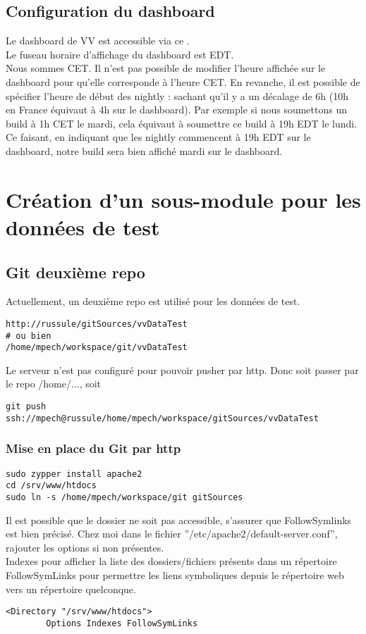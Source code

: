 \documentclass[12pt]{report}
\begin{document}
\section{Configuration du dashboard}
Le dashboard de VV est accessible via ce .\\

Le fuseau horaire d'affichage du dashboard est EDT.\\
Nous sommes CET. Il n'est pas possible de modifier l'heure affichée sur le dashboard pour qu'elle
corresponde à l'heure CET.
En revanche, il est possible de spécifier l'heure de début des nightly : sachant qu'il y a un décalage de 6h
(10h en France équivaut à 4h sur le dashboard). Par exemple si nous soumettons un build à 1h CET le mardi, cela équivaut à soumettre ce build à 19h EDT le lundi.\\
Ce faisant, en indiquant que les nightly commencent à 19h EDT sur le dashboard, notre build sera bien affiché mardi sur le dashboard.


 \chapter{Création d'un sous-module pour les données de test}
\section{Git deuxième repo}
Actuellement, un deuxième repo est utilisé pour les données de test.
\begin{verbatim}
http://russule/gitSources/vvDataTest
# ou bien 
/home/mpech/workspace/git/vvDataTest
\end{verbatim}

Le serveur n'est pas configuré pour pouvoir pusher par http. Donc soit passer par le repo /home/..., soit
\begin{verbatim}
git push ssh://mpech@russule/home/mpech/workspace/gitSources/vvDataTest
\end{verbatim}

\subsection{Mise en place du Git par http}
\begin{verbatim}
sudo zypper install apache2
cd /srv/www/htdocs
sudo ln -s /home/mpech/workspace/git gitSources
\end{verbatim}
Il est possible que le dossier ne soit pas accessible, s'assurer que FollowSymlinks est bien précisé. Chez moi dans
le fichier ''/etc/apache2/default-server.conf'', rajouter les options si non présentes.\\
Indexes pour afficher la liste des dossiers/fichiers présents dans un répertoire \\
FollowSymLinks pour permettre les liens symboliques depuis le répertoire web vers un répertoire quelconque.
\begin{verbatim}
<Directory "/srv/www/htdocs">
        Options Indexes FollowSymLinks
\end{verbatim}
\end{document}
